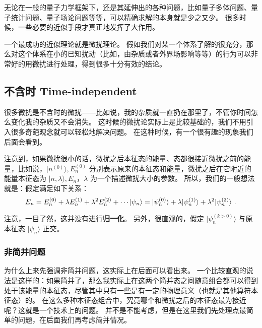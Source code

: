 
\begin{issues}
\issueMissDepend
\end{issues}

无论在一般的量子力学框架下，还是其延伸出的各种问题，比如量子多体问题、量子统计问题、量子场论问题等等，可以精确求解的本身就是少之又少。 很多时候，一些必要的近似手段才真正地发挥了大作用。

一个最成功的近似理论就是微扰理论。 假如我们对某一个体系了解的很充分，那么对这个体系在小的已知扰动（比如，由杂质或者外界场影响等等）的行为可以非常好的用微扰进行处理，得到很多十分有效的结论。

\subsection{不含时 Time-independent}

很多微扰是不含时的微扰——比如说，我的杂质就一直扔在那里了，不管你时间怎么变化我的杂质又不会消失。 这时候的微扰论实际上是比较基础的，我们不用引入很多奇葩观念就可以轻松地解决问题。 在这种时候，有一个很有趣的现象我们后面会看到。

注意到，如果微扰很小的话，微扰之后本征态的能量、态都很接近微扰之前的能量，比如说，$|n^{(0)}\rangle, E_n^{(0)}$ 分别表示原来的本征态和能量，微扰之后在它附近的能量本征态为 $|n,\lambda\rangle, E_n$，$\lambda$ 为一个描述微扰大小的参数。 所以，我们的一般想法就是：假定满足如下关系：
\begin{equation}
E_n = E_n^{(0)} + \lambda E_n^{(1)} + \lambda^2 E_n^{(2)} + \cdots\\
|\psi_n\rangle = |\psi_n^{(0)}\rangle + \lambda|\psi_n^{(1)}\rangle + \lambda^2 |\psi_n^{(2)}\rangle~.
\end{equation}

注意，一目了然，这并没有进行\textbf{归一化}。 另外，很直观的，假定 $|\psi_n^{(k>0)}\rangle$ 与原本征态 $|\psi_n\rangle$ 正交。

\subsubsection{非简并问题}

为什么上来先强调非简并问题，这实际上在后面可以看出来。 一个比较直观的说法是这样的：如果简并了，那么我实际上在这两个简并态之间随意组合都可以得到处于该能量的本征态，尽管其中只有一些是有一定的物理意义（也就是其他算符本征态）的。 在这么多种本征态组合中，究竟哪个和微扰之后的本征态最为接近呢？这就是一个技术上的问题。 并不是不能考虑，但是在这里我们先处理点最简单的问题，在后面我们再考虑简并情况。

